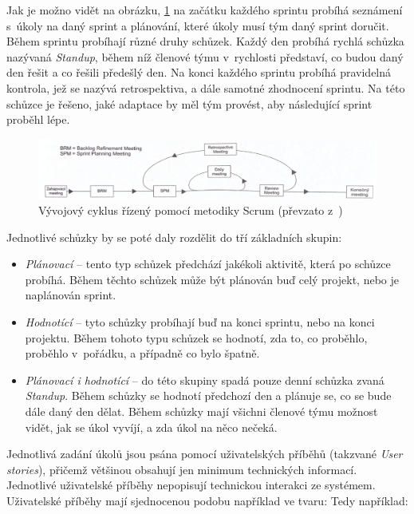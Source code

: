 \documentclass[czech,master]{diploma}
\begin{document}
Jak je možno vidět na obrázku, \ref{fig:scrum_cyklus} na začátku každého sprintu probíhá seznámení s~úkoly na daný sprint a plánování, které úkoly musí tým daný sprint doručit. Během sprintu probíhají různé druhy schůzek. Každý den probíhá rychlá schůzka nazývaná \textit{Standup}, během níž členové týmu v~rychlosti představí, co budou daný den řešit a co řešili předešlý den. Na konci každého sprintu probíhá pravidelná kontrola, jež se nazývá retrospektiva, a dále samotné zhodnocení sprintu. Na této schůzce je řešeno, jaké adaptace by měl tým provést, aby následující sprint proběhl lépe.

\begin{figure}[!ht]
    \centering
    \includegraphics[width=1\textwidth]{Diplomka/Figures/scrum.png}
    \caption{Vývojový cyklus řízený pomocí metodiky Scrum (převzato z~\cite{ref:scrum_myslin_cyklus_img})}
    \label{fig:scrum_cyklus}
\end{figure}

Jednotlivé schůzky by se poté daly rozdělit do tří základních skupin:

\begin{itemize}
\item \textit{Plánovací} -- tento typ schůzek předchází jakékoli aktivitě, která po schůzce probíhá. Během těchto schůzek může být plánován buď celý projekt, nebo je naplánován sprint.
\item \textit{Hodnotící} -- tyto schůzky probíhají buď na konci sprintu, nebo na konci projektu. Během tohoto typu schůzek se hodnotí, zda to, co proběhlo, proběhlo v~pořádku, a případně co bylo špatně.
\item \textit{Plánovací i hodnotící} -- do této skupiny spadá pouze denní schůzka zvaná \textit{Standup}. Během schůzky se hodnotí předchozí den a plánuje se, co se bude dále daný den dělat. Během schůzky mají všichni členové týmu možnost vidět, jak se úkol vyvíjí, a zda úkol na něco nečeká.
\end{itemize}


Jednotlivá zadání úkolů jsou psána pomocí uživatelských příběhů (takzvané \textit{User stories}), přičemž většinou obsahují jen minimum technických informací. Jednotlivé uživatelské příběhy nepopisují technickou interakci ze systémem. Uživatelské příběhy mají  sjednocenou podobu například ve tvaru:  Tedy například:  \cite{ref:scrum_myslin_us}
\end{document}
